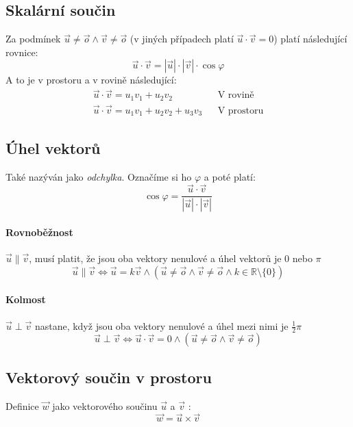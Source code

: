 \documentclass[12pt]{article}
\begin{document}
\subsection{Skalární součin}
Za podmínek $\vec{u} \neq \vec{o} \land \vec{v} \neq \vec{o}$ (v jiných případech platí $ \vec{u} \cdot \vec{v} = 0$) platí následující rovnice:
\begin{equation}
\vec{u} \cdot \vec{v} = | \vec{u}| \cdot |\vec{v}| \cdot \cos \varphi
\end{equation}
A to je v prostoru a v rovině následující:
\begin{align}
\vec{u} \cdot \vec{v} = u_1 v_1 + u_2 v_2 && \text{V rovině}\\
\vec{u} \cdot \vec{v} = u_1 v_1 + u_2 v_2 + u_3 v_3 && \text{V prostoru}
\end{align}
\subsection{Úhel vektorů}
Také nazýván jako \emph{odchylka}. Označíme si ho $\varphi$ a poté platí:
\begin{equation}
\cos \varphi = \frac{\vec{u} \cdot \vec{v}}{ |\vec{u}| \cdot |\vec{v}|}
\end{equation}
\paragraph{Rovnoběžnost} $\vec{u} \| \vec{v}$, musí platit, že jsou oba vektory nenulové a úhel vektorů je $0$ nebo $\pi$
\begin{equation}
\vec{u} \| \vec{v}  \iff  \vec{u} = k \vec{v} \land \left( \vec{u} \neq \vec{o} \land \vec{v} \neq \vec{o} \land k \in \mathbb{R} \setminus \{ 0 \} \right)
\end{equation}
\paragraph{Kolmost} $\vec{u} \perp \vec{v}$ nastane, když jsou oba vektory nenulové a úhel mezi nimi je $\frac{1}{2}\pi$
\begin{equation}
\vec{u} \perp \vec{v} \iff \vec{u} \cdot \vec{v} = 0 \land \left( \vec{u} \neq \vec{o} \land \vec{v} \neq \vec{o} \right)
\end{equation}

\subsection{Vektorový součin v prostoru}
Definice $\vec{w}$ jako vektorového součinu $\vec{u}$ a $\vec{v}$ :
\begin{equation}
\vec{w} = \vec{u} \times \vec{v}
\end{equation}
\end{document}
